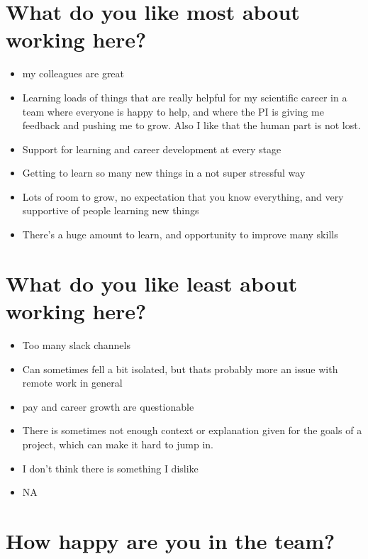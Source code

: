 \documentclass[
]{book}
\providecommand{\tightlist}{%
  \setlength{\itemsep}{0pt}\setlength{\parskip}{0pt}}
\begin{document}
\hypertarget{what-do-you-like-most-about-working-here}{%
\section{What do you like most about working here?}\label{what-do-you-like-most-about-working-here}}

\begin{itemize}
\tightlist
\item
  my colleagues are great
\item
  Learning loads of things that are really helpful for my scientific career in a team where everyone is happy to help, and where the PI is giving me feedback and pushing me to grow. Also I like that the human part is not lost.
\item
  Support for learning and career development at every stage
\item
  Getting to learn so many new things in a not super stressful way
\item
  Lots of room to grow, no expectation that you know everything, and very supportive of people learning new things
\item
  There's a huge amount to learn, and opportunity to improve many skills
\end{itemize}

\hypertarget{what-do-you-like-least-about-working-here}{%
\section{What do you like least about working here?}\label{what-do-you-like-least-about-working-here}}

\begin{itemize}
\tightlist
\item
  Too many slack channels
\item
  Can sometimes fell a bit isolated, but thats probably more an issue with remote work in general
\item
  pay and career growth are questionable
\item
  There is sometimes not enough context or explanation given for the goals of a project, which can make it hard to jump in.
\item
  I don't think there is something I dislike
\item
  NA
\end{itemize}

\hypertarget{how-happy-are-you-in-the-team}{%
\section{How happy are you in the team?}\label{how-happy-are-you-in-the-team}}
\end{document}
